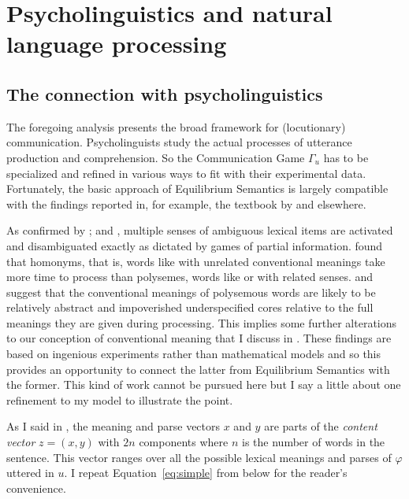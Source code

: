 \chapter{Psycholinguistics and natural language processing} \label{ch:psycholinguistics and cl}

\section{The connection with psycholinguistics} \label{sec:psycholinguistics}

The foregoing analysis presents the broad framework for (locutionary) communication. Psycholinguists study the actual processes of utterance production and comprehension. So the Communication Game $\Gamma_u$ has to be specialized and refined in various ways to fit with their experimental data. Fortunately, the basic approach of Equilibrium Semantics is largely compatible with the findings reported in, for example, the textbook by \citet[Chapters~5--8]{fsc:fp} and elsewhere. 

As confirmed by \citet{swinney:ladsc,os:aladsc}; and \citet{kawamoto:ndrla}, multiple senses of ambiguous lexical items are activated and disambigu\-ated exactly as dictated by games of partial information. \citet{rgmw:mssa} found that homonyms, that is, words like  with unrelated conventional meanings take more time to process than polysemes, words like  or  with related senses. \citet{plm:rp} and \citet{frisson:sulp} suggest that the conventional meanings of polysemous words are likely to be relatively abstract and impoverished underspecified cores relative to the full meanings they are given during processing. This implies some further alterations to our conception of conventional meaning that I discuss in . These findings are based on ingenious experiments rather than mathematical models and so this provides an opportunity to connect the latter from Equilibrium Semantics with the former. This kind of work cannot be pursued here but I say a little about one refinement to my model to illustrate the point.

As I said in , the meaning and parse vectors $x$ and $y$ are parts of the \emph{content vector} $z = (x, y)$ with $2n$ components where $n$ is the number of words in the sentence. This vector ranges over all the possible lexical meanings and parses of $\varphi$ uttered in $u$. I repeat Equation~\ref{eq:simple} from  below for the reader's convenience.

